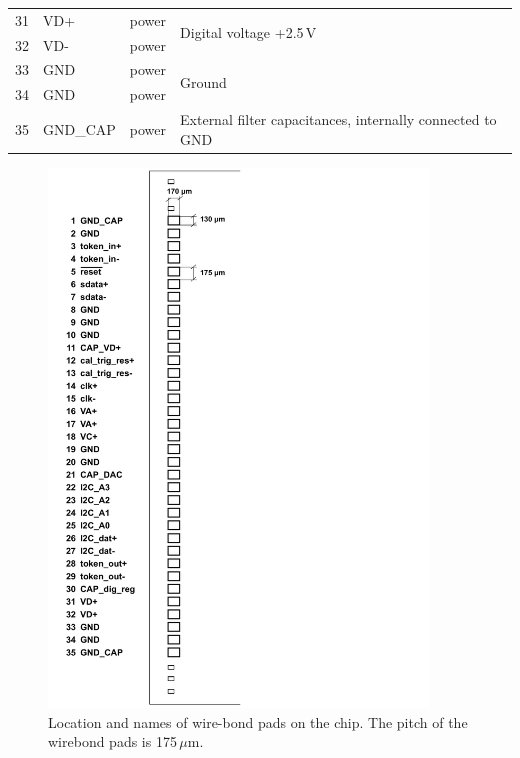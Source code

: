 \begin{table}[ht]
\begin{center}
{\begin{tabular}{clll}
	\midrule %
	31 & VD+             & power  & \multirow{2}{*}{Digital voltage +2.5\,V} \\
	32 & VD-             & power  & \\
	\midrule %
	33 & GND             & power  & \multirow{2}{*}{Ground}\\
	34 & GND             & power  & \\
	\midrule %
	35 & GND\_CAP        & power & External filter capacitances, internally connected to GND \\
	\bottomrule %
	\end{tabular}
	}
    \end{center}
\end{table}


\begin{figure}[hbtp]
	\begin{center}
	\includegraphics[width=0.9\textwidth]{img/PadLayout.pdf}
	\end{center}
	\caption{Location and names of wire-bond pads on the chip. The pitch of the wirebond pads is 175\,$\mu$m.}
	\label{fig:ROCpadschematic}
\end{figure}



